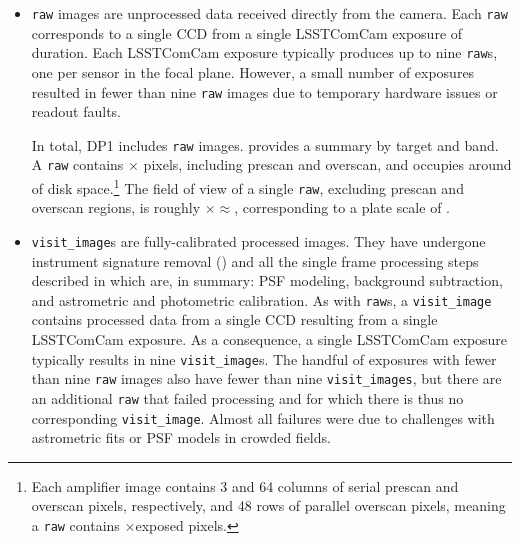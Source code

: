 \begin{itemize}
\item \texttt{raw} images \citep{10.71929/rubin/2570310} are unprocessed data received directly from the \gls{camera}.
Each \texttt{raw} corresponds to a single \gls{CCD} from a single \gls{LSSTComCam} exposure of \exposuretime duration.
Each \gls{LSSTComCam} exposure typically produces up to nine \texttt{raw}s, one per sensor in the focal plane.
However, a small number of exposures resulted in fewer than nine \texttt{raw} images due to temporary hardware issues or readout faults.

In total, \gls{DP1} includes \nraws \texttt{raw} images.
 provides a summary by target and band.
A \texttt{raw} contains \nrawpixx $\times$ \nrawpixy pixels, including prescan and overscan, and occupies around \rawhdd of disk space.\footnote{Each amplifier image contains 3 and 64 columns of serial prescan and overscan pixels, respectively, and 48 rows of parallel overscan pixels, meaning a \texttt{raw} contains \nvisitimagepixx$\times$\nvisitimagepixy exposed pixels.}
The field of view of a single \texttt{raw}, excluding prescan and overscan regions, is roughly \visitimagefovx$\times$\visitimagefovy$\approx$\visitimagefov, corresponding to a plate scale of \rawplatescale.






\item \texttt{visit\_image}s \citep{10.71929/rubin/2570311} are fully-calibrated processed images.
They have undergone instrument signature removal () and all the single frame processing steps described in  which are, in summary: \gls{PSF} modeling, \gls{background} subtraction, and astrometric and photometric \gls{calibration}.
As with \texttt{raw}s, a \texttt{visit\_image} contains processed data from a single \gls{CCD} resulting from a single \exposuretime \gls{LSSTComCam} exposure.
As a consequence, a single \gls{LSSTComCam} exposure typically results in nine \texttt{visit\_image}s.
The handful of exposures with fewer than nine \texttt{raw} images also have fewer than nine \texttt{visit\_images}, but there are an additional \nsfpfails \texttt{raw} that failed processing and for which there is thus no corresponding \texttt{visit\_image}.
Almost all failures were due to challenges with astrometric fits or \gls{PSF} models in crowded fields.


\end{itemize}
